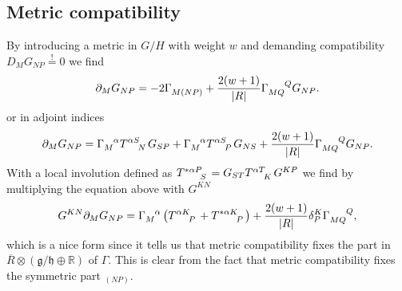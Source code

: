 \documentclass{article}
\begin{document}
\subsection{Metric compatibility}
By introducing a metric in $G/H$ with weight $w$ and demanding compatibility $D_M G_{NP}\overset{!}{=}0$ we find 
\begin{equation}
    \pd_MG_{NP} = -2\tensor{\Gamma}{_{M(NP)}}+\frac{2(w+1)}{|R|}\tensor{\Gamma}{_{MQ}^Q}G_{NP}.
\end{equation}
or in adjoint indices 
\begin{equation}
    \pd_MG_{NP} = \tensor{\Gamma}{_M^\alpha}\tensor{T}{^\alpha^S_N}G_{SP}+\tensor{\Gamma}{_M^\alpha}\tensor{T}{^\alpha^S_P}G_{NS}+\frac{2(w+1)}{|R|}\tensor{\Gamma}{_{MQ}^Q}G_{NP}.
\end{equation}
With a local involution defined as $\tensor{T}{^{*\alpha P }_S}=G_{ST}\tensor{T}{^{\alpha T }_K}G^{KP}$ we find by multiplying the equation above with $G^{KN}$
\begin{equation}
    G^{KN}\pd_MG_{NP} = \tensor{\Gamma}{_M^\alpha}\left(\tensor{T}{^\alpha^K_P}+\tensor{T}{^{*\alpha K}_P}\right)+\frac{2(w+1)}{|R|}\delta^K_P\tensor{\Gamma}{_{MQ}^Q},
\end{equation}
which is a nice form since it tells us that metric compatibility fixes the part in $\overbar{R}\otimes (\mathfrak{g}/\mathfrak{h}\oplus\mathbb{R})$ of $\Gamma$. This is clear from the fact that metric compatibility fixes the symmetric part $_{(NP)}$. 
\end{document}
